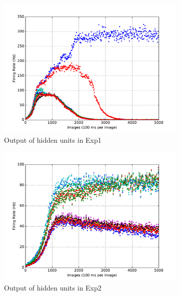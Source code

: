 \begin{figure}
\begin{subfigure}[t]{0.4\textwidth}
		\includegraphics[width=\textwidth]{pics_sdlm/11_exp_SRBM_Orig_long/exp1_hid_s.pdf}
		\caption{Output of hidden units in Exp1}
	\end{subfigure}
	\begin{subfigure}[t]{0.4\textwidth}
		\includegraphics[width=\textwidth]{pics_sdlm/11_exp_SRBM_Orig_long/exp2_hid_s.pdf}
		\caption{Output of hidden units in Exp2}
	\end{subfigure}\\
	\begin{subfigure}[t]{0.4\textwidth}

\end{subfigure}
\end{figure}
